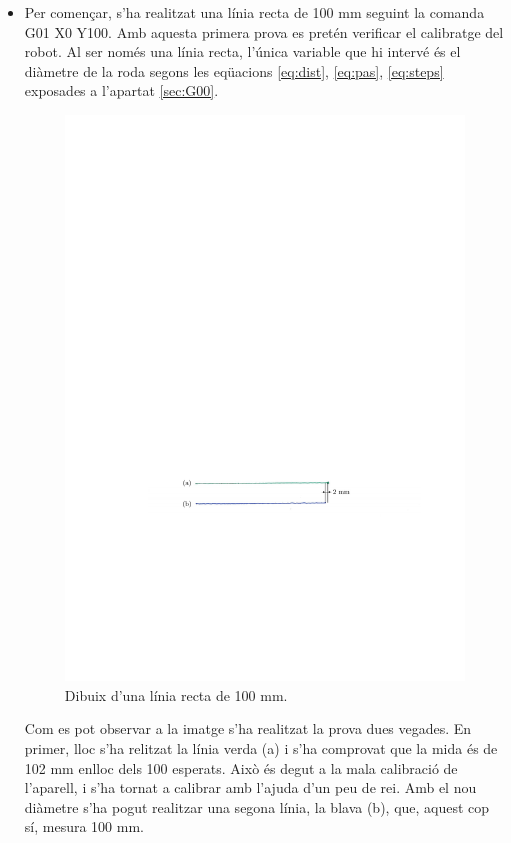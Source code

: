 \begin{itemize}
	\item Per començar, s'ha realitzat una línia recta de 100 mm seguint la comanda G01 X0 Y100. Amb aquesta primera prova es pretén verificar el calibratge del robot. Al ser només una línia recta, l'única variable que hi intervé és el diàmetre de la roda segons les eqüacions \ref{eq:dist}, \ref{eq:pas}, \ref{eq:steps} exposades a l'apartat \ref{sec:G00}.
	\begin{figure}[H]
		\centering
		\includegraphics{resultatLinia}
		\caption{Dibuix d'una línia recta de 100 mm.}
		\label{fig:linia}
	\end{figure}
	Com es pot observar a la imatge s'ha realitzat la prova dues vegades. En primer, lloc s'ha relitzat la línia verda (a) i s'ha comprovat que la mida és de 102 mm enlloc dels 100 esperats. Això és degut a la mala calibració de l'aparell, i s'ha tornat a calibrar amb l'ajuda d'un peu de rei. Amb el nou diàmetre s'ha pogut realitzar una segona línia, la blava (b), que, aquest cop sí, mesura 100 mm. 
	

\end{itemize}
